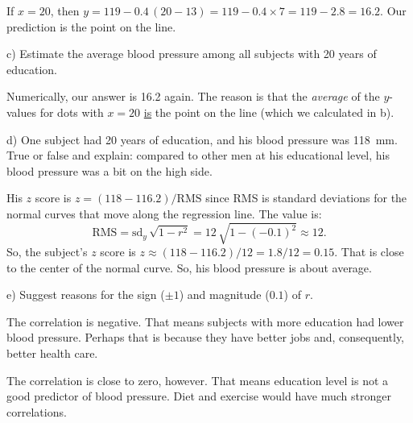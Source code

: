 \documentclass[10pt]{article}
\begin{document}
{\color{blue}
If $x=20$, then $y=119 - 0.4\,(20 - 13) = 119 - 0.4\times 7 = 119-2.8 = 16.2$.
Our prediction is the point on the line.}
\medskip

\hspace{20pt} c) Estimate the average blood pressure among all subjects with 20 years of education.

{\color{blue} Numerically, our answer is 16.2 again.  The reason is that
the \textit{average} of the $y$-values for dots with $x=20$ \underline{is}
the point on the line (which we calculated in b).}
\bigskip

\hspace{20pt} d) One subject  had 20 years of education, and his 
blood pressure was 118~mm.  True or false and explain:  compared to other men
at his educational level, his blood pressure was a bit on the high side.

{\color{blue} His $z$ score is $z=(118 - 116.2)/\mbox{RMS}$ since 
RMS is standard deviations for the normal curves that move along 
the regression line.  The value is:
\[\mbox{RMS}=\mbox{sd}_y\,\sqrt{1-r^2} = 12\,\sqrt{1 - (-0.1)^2} \approx 12.\]
So, the subject's $z$ score is $z\approx (118-116.2)/12=1.8/12 = 0.15$.
That is close to the center of the normal curve.  So, his blood 
pressure is about average.}
\bigskip

\hspace{20pt} e) Suggest reasons for the sign ($\pm 1$) and magnitude ($0.1$) of $r$.

{\color{blue} The correlation is negative.  That means subjects with
more education had lower blood pressure.  Perhaps that is because
they have better jobs and, consequently, better health care.  

The correlation is close to zero, however.  That means education
level is not a good predictor of blood pressure.  Diet and exercise
would have much stronger correlations.}

\vfill
\eject          
\end{document}
